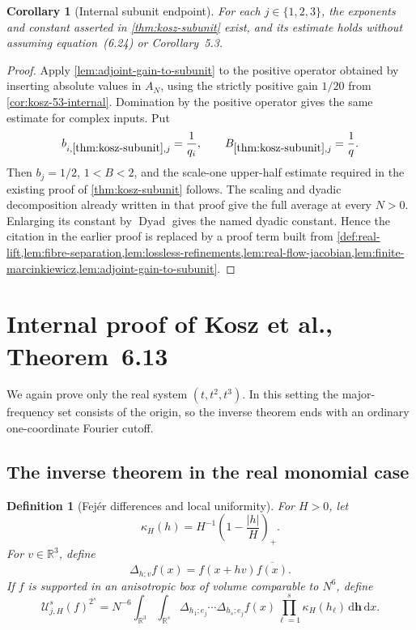 \documentclass[11pt]{article}
\newtheorem{corollary}[theorem]{Corollary}
\newtheorem{definition}[theorem]{Definition}
\newcommand{\R}{\mathbb{R}}
\newcommand{\Dyad}{\operatorname{Dyad}}
\newcommand{\dd}{\,\mathrm{d}}
\newcommand{\abs}[1]{\left|#1\right|}
\newcommand{\indices}{\{1,2,3\}}
\begin{document}
	\begin{corollary}[Internal subunit endpoint]\label{cor:kosz-subunit-internal}
		For each \(j\in\indices\), the exponents and constant asserted in
		\cref{thm:kosz-subunit} exist, and its estimate holds without assuming equation~(6.24) or Corollary~5.3.
	\end{corollary}
	
	\begin{proof}
		Apply \cref{lem:adjoint-gain-to-subunit} to the positive operator obtained by inserting absolute values in \(A_N\), using the strictly positive gain \(1/20\) from
		\cref{cor:kosz-53-internal}.  Domination by the positive operator gives the same estimate for complex inputs.  Put
		\[
		b_{i,\ref{thm:kosz-subunit},j}=\frac1{q_i},
		\qquad
		B_{\ref{thm:kosz-subunit},j}=\frac1q.
		\]
		Then \(b_j=1/2\), \(1<B<2\), and the scale-one upper-half estimate required in the existing proof of \cref{thm:kosz-subunit} follows.  The scaling and dyadic decomposition already written in that proof give the full average at every \(N>0\).  Enlarging its constant by \(\Dyad\) gives the named dyadic constant.  Hence the citation in the earlier proof is replaced by a proof term built from
		\cref{def:real-lift,lem:fibre-separation,lem:lossless-refinements,lem:real-flow-jacobian,lem:finite-marcinkiewicz,lem:adjoint-gain-to-subunit}.
	\end{proof}
	
	\section{Internal proof of Kosz et al., Theorem~6.13}\label{sec:internal-kosz-adjoint}
	
	We again prove only the real system \((t,t^2,t^3)\).  In this setting the major-frequency set consists of the origin, so the inverse theorem ends with an ordinary one-coordinate Fourier cutoff.
	
	\subsection{The inverse theorem in the real monomial case}
	
	\begin{definition}[Fej\'er differences and local uniformity]\label{def:local-uniformity}
		For \(H>0\), let
		\[
		\kappa_H(h)=H^{-1}\left(1-\frac{\abs h}{H}\right)_+.
		\]
		For \(v\in\R^3\), define
		\[
		\Delta_{h;v}f(x)=f(x+hv)\overline{f(x)}.
		\]
		If \(f\) is supported in an anisotropic box of volume comparable to \(N^6\), define
		\[
		\mathcal U^s_{j,H}(f)^{2^s}
		=
		N^{-6}\int_{\R^3}\int_{\R^s}
		\Delta_{h_1;e_j}\cdots\Delta_{h_s;e_j}f(x)
		\prod_{\ell=1}^s\kappa_H(h_\ell)\dd\mathbf h\dd x.
		\]
	\end{definition}
	
\end{document}
